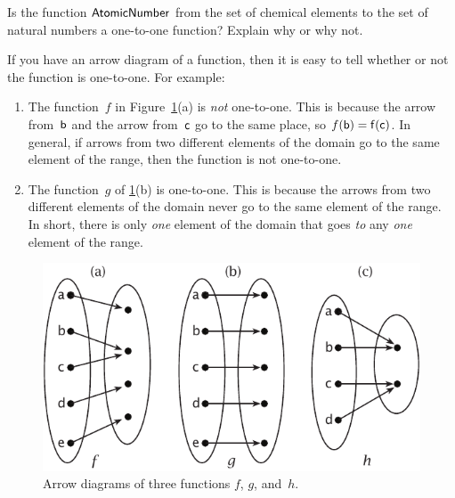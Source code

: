 \begin{exercise}{}
Is the function $\sf{Atomic Number}$ from the set of chemical elements to the set of natural numbers a one-to-one function?  Explain why or why not.
\end{exercise}

\begin{rem}
If you have an arrow diagram of a function, then it is easy to tell whether or not the function is one-to-one. For example:

\begin{enumerate}
\item The function~$f$ in Figure~\ref{arrow11}(a) is \emph{not} one-to-one. This is because the arrow from~$\sf{b}$ and the arrow from~$\sf{c}$ go to the same place, so $f(\sf{b}) = f(\sf{c})$. In general, if arrows from two different elements of the domain go to the same element of the range, then the function is not one-to-one. 
\item The function~$g$ of \ref{arrow11}(b) is one-to-one. This is because the arrows from two different elements of the domain never go to the same element of the range.  In short, there is only \emph{one} element of the domain that goes \emph{to} any \emph{one} element of the range.  
\end{enumerate}
\end{rem}
\begin{figure}[h]
\includegraphics{images/arrow11.pdf}
\caption{Arrow diagrams of three functions $f$, $g$, and~$h$.}
\label{arrow11}
\end{figure}

